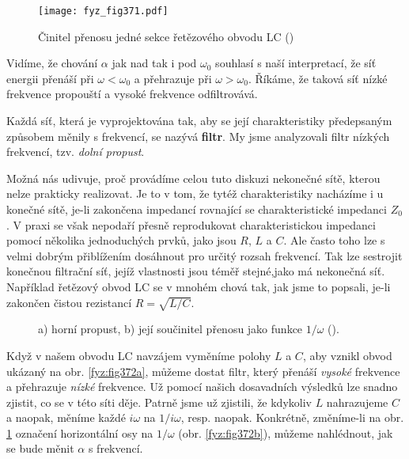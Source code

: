  \begin{figure}[ht!] %
    \centering
    \texttt{[image: fyz\_fig371.pdf]}
    \caption{Činitel přenosu jedné sekce řetězového obvodu LC
             (\cite[s.~411]{Feynman02})}
    \label{fyz:fig371}
  \end{figure}
  
  Vidíme, že chování \(\alpha\) jak nad tak i pod \(\omega_0\) souhlasí s naší interpretací, že síť 
  energii přenáší při \(\omega<\omega_0\) a přehrazuje při \(\omega>\omega_0\). Říkáme, že taková 
  síť nízké frekvence propouští a vysoké frekvence odfiltrovává.
  
  Každá síť, která je vyprojektována tak, aby se její charakteristiky předepsaným způsobem měnily s 
  frekvencí, se nazývá \textbf{filtr}. My jsme analyzovali filtr nízkých frekvencí, tzv. 
  \emph{dolní propust}.
  
  Možná nás udivuje, proč provádíme celou tuto diskuzi nekonečné sítě, kterou nelze prakticky 
  realizovat. Je to v tom, že tytéž charakteristiky nacházíme i u konečné sítě, je-li zakončena 
  impedancí rovnající se charakteristické impedanci \(Z_0\). V praxi se však nepodaří přesně 
  reprodukovat charakteristickou impedanci pomocí několika jednoduchých prvků, jako jsou \(R\), 
  \(L\) a \(C\). Ale často toho lze s velmi dobrým přiblížením dosáhnout pro určitý rozsah 
  frekvencí. Tak lze sestrojit konečnou filtrační síť, jejíž vlastnosti jsou téměř stejné,jako má 
  nekonečná síť. Například řetězový obvod LC se v mnohém chová tak, jak jsme to popsali, je-li 
  zakončen čistou rezistancí \(R = \sqrt{L/C}\).
    
  \begin{figure}[ht!] %
    \centering
     \newline
    \caption{a) horní propust, b) její součinitel přenosu jako funkce \(1/\omega\)
             (\cite[s.~411]{Feynman02}).}
    \label{fyz:fig372}
  \end{figure}
  
  Když v našem obvodu LC navzájem vyměníme polohy \(L\) a \(C\), aby vznikl obvod ukázaný na obr. 
  \ref{fyz:fig372a}, můžeme dostat filtr, který přenáší \emph{vysoké} frekvence a přehrazuje 
  \emph{nízké} frekvence. Už pomocí našich dosavadních výsledků lze snadno zjistit, co se v této 
  síti děje. Patrně jsme už zjistili, že kdykoliv \(L\) nahrazujeme \(C\) a naopak, měníme každé 
  \(i\omega\) na \(1/i\omega\), resp. naopak. Konkrétně, změníme-li na obr. \ref{fyz:fig371} 
  označení horizontální osy na \(1/\omega\) (obr. \ref{fyz:fig372b}), můžeme nahlédnout, jak se 
  bude měnit \(\alpha\) s frekvencí. 
  
